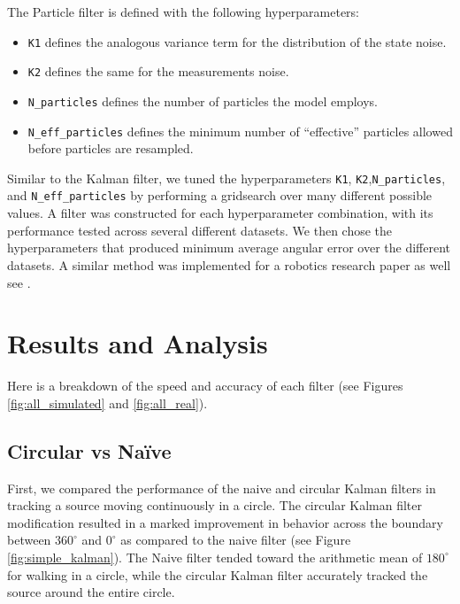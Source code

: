 \documentclass[11pt]{amsart}
\begin{document}
The Particle filter is defined with the following hyperparameters: 
\begin{itemize}
    \item \lstinline{K1} defines the analogous variance term for the distribution of the state noise.
    \item \lstinline{K2} defines the same for the measurements noise.
    \item \lstinline{N_particles} defines the number of particles the model employs.
    \item \lstinline{N_eff_particles} defines the minimum number of “effective” particles allowed before particles are resampled.
\end{itemize}

Similar to the Kalman filter, we tuned the hyperparameters \lstinline{K1},
\lstinline{K2},\newline \lstinline{N_particles}, and \lstinline{N_eff_particles} by performing a
gridsearch over many different possible values. A filter was constructed for each hyperparameter
combination, with its performance tested across several different datasets. We then chose the
hyperparameters that produced minimum average angular error over the different datasets. A similar
method was implemented for a robotics research paper as well see \cite{Oops}.

\section{Results and Analysis}
Here is a breakdown of the speed and accuracy of each filter (see Figures \ref{fig:all_simulated} and \ref{fig:all_real}).

\subsection{Circular vs Naïve}
First, we compared the performance of the naive and circular Kalman filters in tracking a source moving continuously in a circle. The circular Kalman filter modification resulted in a marked improvement in behavior across the boundary between $360^{\circ}$ and $0^{\circ}$ as 
compared to the naive filter (see Figure \ref{fig:simple_kalman}). The Naive filter tended toward the arithmetic mean of $180^{\circ}$ for walking in a circle, while the circular Kalman filter accurately tracked the source around the entire circle.
\end{document}
